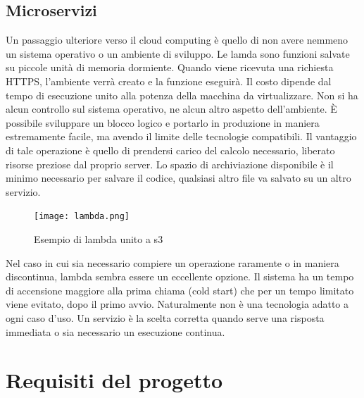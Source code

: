 \documentclass[12pt]{article}
\begin{document}
\subsection{Microservizi}
Un passaggio ulteriore verso il cloud computing è quello di non avere nemmeno 
un sistema operativo o un ambiente di sviluppo.
Le lamda sono funzioni salvate su piccole unità di memoria dormiente. 
Quando viene ricevuta una richiesta HTTPS, l'ambiente verrà creato e la 
funzione eseguirà. 
Il costo dipende dal tempo di esecuzione unito alla potenza della macchina 
da virtualizzare. 
Non si ha alcun controllo sul sistema operativo, ne alcun altro aspetto 
dell'ambiente.
È possibile sviluppare un blocco logico e portarlo in produzione in maniera 
estremamente facile, ma avendo il limite delle tecnologie compatibili.
Il vantaggio di tale operazione è quello di prendersi carico del calcolo 
necessario, liberato risorse preziose dal proprio server. 
Lo spazio di archiviazione disponibile è il minimo necessario per salvare il 
codice, qualsiasi altro file va salvato su un altro servizio.
\begin{figure}[H]
\texttt{[image: lambda.png]}
\centering
\caption{Esempio di lambda unito a s3}
\end{figure}
Nel caso in cui sia necessario compiere un operazione raramente o in maniera 
discontinua, lambda sembra essere un eccellente opzione. 
Il sistema ha un tempo di accensione maggiore alla prima chiama (cold start)
che per un tempo limitato viene evitato, dopo il primo avvio.
Naturalmente non è una tecnologia adatto a ogni caso d'uso. 
Un servizio è la scelta corretta 
quando serve una risposta immediata o sia necessario un esecuzione continua.

\section{Requisiti del progetto}
\end{document}
